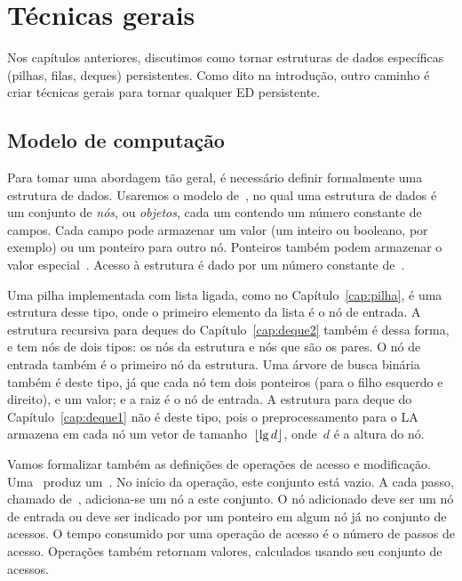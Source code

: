 \documentclass[../../main.tex]{subfiles}
\begin{document}
\chapter{Técnicas gerais} \label{cap:geral}

Nos capítulos anteriores, discutimos como tornar estruturas de dados específicas (pilhas, filas, deques) persistentes. Como dito na introdução, outro caminho é criar técnicas gerais para tornar qualquer ED persistente.


\section{Modelo de computação}

Para tomar uma abordagem tão geral, é necessário definir formalmente uma estrutura de dados.  Usaremos o modelo de~, no qual uma estrutura de dados é um conjunto de \emph{nós}, ou \emph{objetos}, cada um contendo um número constante de campos. Cada campo pode armazenar um valor (um inteiro ou booleano, por exemplo) ou um ponteiro para outro nó. Ponteiros também podem armazenar o valor especial~.  Acesso à estrutura é dado por um número constante de~.


Uma pilha implementada com lista ligada, como no Capítulo~\ref{cap:pilha}, é uma estrutura desse tipo, onde o primeiro elemento da lista é o nó de entrada. A estrutura recursiva para deques do Capítulo~\ref{cap:deque2} também é dessa forma, e tem nós de dois tipos: os nós da estrutura e nós que são os pares. O nó de entrada também é o primeiro nó da estrutura.  Uma árvore de busca binária também é deste tipo, já que cada nó tem dois ponteiros (para o filho esquerdo e direito), e um valor; e a raiz é o nó de entrada.  A estrutura para deque do Capítulo~\ref{cap:deque1} não é deste tipo, pois o preprocessamento para o LA armazena em cada nó um vetor de tamanho~$\lfloor\lg d\rfloor$, onde~$d$ é a altura do nó.

Vamos formalizar também as definições de operações de acesso e modificação. Uma~ produz um~. No início da operação, este conjunto está vazio.  A cada passo, chamado de~, adiciona-se um nó a este conjunto. O nó adicionado deve ser um nó de entrada ou deve ser indicado por um ponteiro em algum nó já no conjunto de acessos. O tempo consumido por uma operação de acesso é o número de passos de acesso. Operações também retornam valores, calculados usando seu conjunto de acessos.
\end{document}
